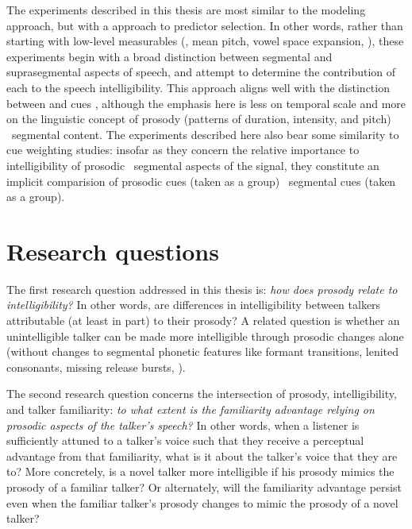 
The experiments described in this thesis are most similar to the modeling approach, but with a  approach to predictor selection.  In other words, rather than starting with low-level measurables (\eg, mean pitch, vowel space expansion, \etc), these experiments begin with a broad distinction between segmental and suprasegmental aspects of speech, and attempt to determine the contribution of each to the speech intelligibility.  This approach aligns well with the distinction between  and  cues \citep{Rosen1992}, although the emphasis here is less on temporal scale and more on the linguistic concept of prosody (patterns of duration, intensity, and pitch) \vs\ segmental content.\footnotemark{}  The experiments described here also bear some similarity to cue weighting studies: insofar as they concern the relative importance to intelligibility of prosodic \vs\ segmental aspects of the signal, they constitute an implicit comparision of prosodic cues (taken as a group) \vs\ segmental cues (taken as a group).


\section{Research questions}
The first research question addressed in this thesis is: {\em how does prosody relate to intelligibility?}  In other words, are differences in intelligibility between talkers attributable (at least in part) to their prosody?  A related question is whether an unintelligible talker can be made more intelligible through prosodic changes alone (without changes to segmental phonetic features like formant transitions, lenited consonants, missing release bursts, \etc).


The second research question concerns the intersection of prosody, intelligibility, and talker familiarity: {\em to what extent is the familiarity advantage relying on prosodic aspects of the talker’s speech?}  In other words, when a  listener is sufficiently attuned to a talker’s voice such that they receive a perceptual advantage from that familiarity, what is it about the talker’s voice that they are  to?  More concretely, is a novel talker more intelligible if his prosody mimics the prosody of a familiar talker?  Or alternately, will the familiarity advantage persist even when the familiar talker’s prosody changes to mimic the prosody of a novel talker?

